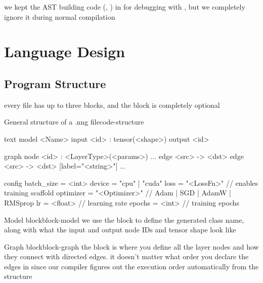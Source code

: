 \documentclass{nngraph-en}
\begin{document}
\begin{notebox}
we kept the AST building code (, ) in  for debugging with , but we completely ignore it during normal compilation
\end{notebox}

\chapter{Language Design}

\section{Program Structure}

every  file has up to three blocks, and the  block is completely optional

\begin{codebox}{General structure of a .nng file}{code-structure}
\begin{amzcode}{text}
model <Name> {
    input  <id> : tensor(<shape>)
    output <id>
}

graph {
    node <id> : <LayerType>(<params>)
    ...
    edge <src> -> <dst>
    edge <src> -> <dst> [label="<string>"]
    ...
}

config {
    batch_size = <int>
    device     = "cpu" | "cuda"
    loss       = "<LossFn>"       // enables training scaffold
    optimizer  = "<Optimizer>"    // Adam | SGD | AdamW | RMSprop
    lr         = <float>          // learning rate
    epochs     = <int>            // training epochs
}
\end{amzcode}
\end{codebox}

\begin{dfnbox}{Model block}{block-model}
we use the  block to define the generated class name, along with what the input and output node IDs and tensor shape look like
\end{dfnbox}

\begin{dfnbox}{Graph block}{block-graph}
the  block is where you define all the layer nodes and how they connect with directed edges. it doesn't matter what order you declare the edges in since our compiler figures out the execution order automatically from the structure
\end{dfnbox}
\end{document}
